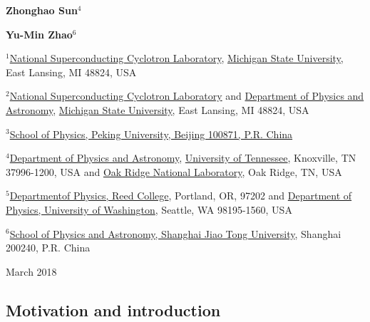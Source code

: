 \documentclass[%
oneside,                 %
final,                   %
10pt]{article}
\begin{document}
\begin{center}
{\bf Zhonghao Sun${}^{4}$} \\ [0mm]
\end{center}


\begin{center}
{\bf Yu-Min Zhao${}^{6}$} \\ [0mm]
\end{center}

\begin{center}
\centerline{{\small ${}^1$\href{{http://www.nscl.msu.edu/}}{National Superconducting Cyclotron Laboratory}, \href{{http://www.msu.edu/}}{Michigan State University}, East Lansing, MI 48824, USA}}
\centerline{{\small ${}^2$\href{{http://www.nscl.msu.edu/}}{National Superconducting Cyclotron Laboratory} and \href{{https://www.pa.msu.edu/}}{Department of Physics and Astronomy}, \href{{http://www.msu.edu/}}{Michigan State University}, East Lansing, MI 48824, USA}}
\centerline{{\small ${}^3$\href{{http://english.pku.edu.cn/}}{School of Physics, Peking University, Beijing 100871, P.R. China}}}
\centerline{{\small ${}^4$\href{{https://www.phys.utk.edu/}}{Department of Physics and Astronomy}, \href{{http://www.utk.edu/}}{University of Tennessee}, Knoxville, TN 37996-1200, USA and \href{{http://www.ornl.gov/}}{Oak Ridge National Laboratory}, Oak Ridge, TN, USA}}
\centerline{{\small ${}^5$\href{{http://www.reed.edu/}}{Departmentof Physics, Reed College}, Portland, OR, 97202 and \href{{https://sharepoint.washington.edu/phys/Pages/default.aspx}}{Department of Physics, University of Washington}, Seattle, WA 98195-1560, USA}}
\centerline{{\small ${}^6$\href{{http://www.physics.sjtu.edu.cn/en/about/news/3}}{School of Physics and Astronomy, Shanghai Jiao Tong University}, Shanghai 200240, P.R. China}}
\end{center}
    


\begin{center}
March 2018
\end{center}

\vspace{1cm}


\subsection{Motivation and introduction}

\end{document}
